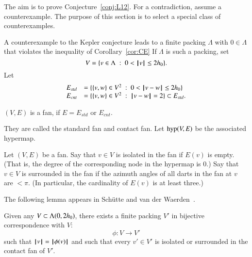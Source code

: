 The aim is to prove Conjecture~\ref{conj:L12}.  For a contradiction, assume a counterexample.  The purpose of this section is to select a special class of counterexamples.

A counterexample to the Kepler conjecture leads to a finite packing $\Lambda$ with $0\in\Lambda$ that violates the inequality of Corollary~\ref{cor:CE}
If $\Lambda$ is such a packing, set
$$
V = \{v\in \Lambda\ :\  0 < {{\hskip0.1em|\hskip-0.15em|\hskip0.1em}v{\hskip0.1em|\hskip-0.15em|\hskip0.1em}}\le 2{h_0}\}.
$$
Let
\begin{equation}\label{eqn:fan-edge}
\begin{array}{lll}
 E_{std} &= \{\{v,w\}\in V^2\ :\  0 < {\hskip0.1em|\hskip-0.15em|\hskip0.1em}v - w{\hskip0.1em|\hskip-0.15em|\hskip0.1em}\le 2{h_0} \}\\
 E_{cnt} &= \{\{v,w\}\in V^2\ :\  {\hskip0.1em|\hskip-0.15em|\hskip0.1em}v - w{\hskip0.1em|\hskip-0.15em|\hskip0.1em}= 2 \}\subset E_{std}.
\end{array}
\end{equation}

\begin{lemma}
$(V,E)$ is a fan, if $E=E_{std}$ or $E_{cnt}$.
\end{lemma}
They are called the standard fan and contact fan.
Let ${\operatorname{hyp}}(V,E)$ be the associated hypermap.

\begin{definition}
Let $(V,E)$ be a fan.
Say that $v\in V$ is isolated in the fan if $E(v)$ is empty.
(That is, the degree of the corresponding node in the hypermap is $0$.) Say that $v\in V$ is surrounded in the fan if the azimuth angles of all darts in the fan at $v$ are $<\pi$.  (In particular, the cardinality of $E(v)$ is at least three.)
\end{definition}

The following lemma appears in Sch\"utte and van der Waerden~\cite{vanderWaerden:1951}.

\begin{lemma}
Given any $V\subset \Lambda(0,2{h_0})$,
there exists a finite packing $V'$ 
in bijective correspondence with $V$:
$$
\phi:V\to V'
$$
such that ${{\hskip0.1em|\hskip-0.15em|\hskip0.1em}v{\hskip0.1em|\hskip-0.15em|\hskip0.1em}} = {{\hskip0.1em|\hskip-0.15em|\hskip0.1em}\phi(v){\hskip0.1em|\hskip-0.15em|\hskip0.1em}}$ and
such that every $v'\in V'$
is isolated or surrounded in the contact fan of $V'$.
\end{lemma}

